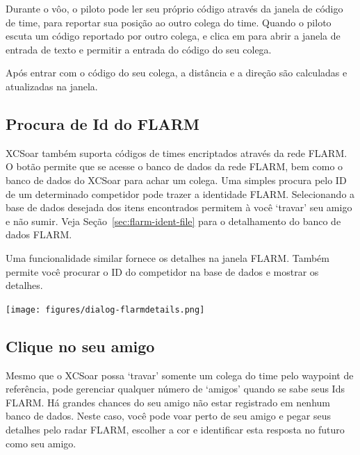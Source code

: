 Durante o vôo, o piloto pode ler seu próprio código através da janela de código de time, para reportar sua posição ao outro colega do time.  Quando o piloto escuta um código reportado por outro colega, e clica em  
para abrir a janela de entrada de texto e permitir a entrada do código do seu colega.

Após entrar com o código do seu colega, a distância e a direção são calculadas e atualizadas na janela.  

\subsection*{Procura de Id do FLARM}

XCSoar também suporta códigos de times encriptados através da rede FLARM.  O botão   permite que se acesse o banco de dados da rede FLARM, bem como o banco de dados do XCSoar para achar um colega.  Uma simples procura pelo ID de um determinado competidor pode trazer a identidade FLARM.  Selecionando a base de dados desejada dos itens encontrados permitem à você ‘travar’ seu amigo e não sumir.  Veja Seção~\ref{sec:flarm-ident-file} 
para o detalhamento do banco de dados FLARM.

Uma funcionalidade similar fornece os detalhes na janela FLARM.  Também permite você procurar o ID do competidor na base de dados e mostrar os detalhes.  

\begin{center}
\texttt{[image: figures/dialog-flarmdetails.png]}
\end{center}


\subsection*{Clique no seu amigo}
Mesmo que o XCSoar possa ‘travar’ somente um colega do time pelo waypoint de referência, pode gerenciar qualquer número de ‘amigos’ quando se sabe seus Ids FLARM.  Há grandes chances do seu amigo não estar registrado em nenhum banco de dados.  Neste caso, você pode voar perto de seu amigo e pegar seus detalhes pelo radar FLARM, escolher a cor e identificar esta resposta no futuro como seu amigo.  


